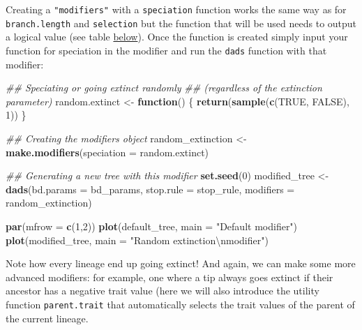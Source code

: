 \documentclass[]{book}
\newenvironment{Shaded}{\begin{snugshade}}{\end{snugshade}}
\newcommand{\CharTok}[1]{\textcolor[rgb]{0.31,0.60,0.02}{#1}}
\newcommand{\CommentTok}[1]{\textcolor[rgb]{0.56,0.35,0.01}{\textit{#1}}}
\newcommand{\ControlFlowTok}[1]{\textcolor[rgb]{0.13,0.29,0.53}{\textbf{#1}}}
\newcommand{\DataTypeTok}[1]{\textcolor[rgb]{0.13,0.29,0.53}{#1}}
\newcommand{\DecValTok}[1]{\textcolor[rgb]{0.00,0.00,0.81}{#1}}
\newcommand{\KeywordTok}[1]{\textcolor[rgb]{0.13,0.29,0.53}{\textbf{#1}}}
\newcommand{\NormalTok}[1]{#1}
\newcommand{\OtherTok}[1]{\textcolor[rgb]{0.56,0.35,0.01}{#1}}
\newcommand{\StringTok}[1]{\textcolor[rgb]{0.31,0.60,0.02}{#1}}
\begin{document}
Creating a \texttt{"modifiers"} with a \texttt{speciation} function works the same way as for \texttt{branch.length} and \texttt{selection} but the function that will be used needs to output a logical value (see table \protect\hyperlink{summarymodifiers}{below}).
Once the function is created simply input your function for speciation in the modifier and run the \texttt{dads} function with that modifier:

\begin{Shaded}
\begin{Highlighting}[]
\CommentTok{## Speciating or going extinct randomly}
\CommentTok{## (regardless of the extinction parameter)}
\NormalTok{random.extinct  <-}\StringTok{ }\ControlFlowTok{function}\NormalTok{() \{}
    \KeywordTok{return}\NormalTok{(}\KeywordTok{sample}\NormalTok{(}\KeywordTok{c}\NormalTok{(}\OtherTok{TRUE}\NormalTok{, }\OtherTok{FALSE}\NormalTok{), }\DecValTok{1}\NormalTok{))}
\NormalTok{\}}

\CommentTok{## Creating the modifiers object}
\NormalTok{random_extinction <-}\StringTok{ }\KeywordTok{make.modifiers}\NormalTok{(}\DataTypeTok{speciation =}\NormalTok{ random.extinct)}

\CommentTok{## Generating a new tree with this modifier}
\KeywordTok{set.seed}\NormalTok{(}\DecValTok{0}\NormalTok{)}
\NormalTok{modified_tree <-}\StringTok{ }\KeywordTok{dads}\NormalTok{(}\DataTypeTok{bd.params =}\NormalTok{ bd_params,}
                      \DataTypeTok{stop.rule =}\NormalTok{ stop_rule,}
                      \DataTypeTok{modifiers =}\NormalTok{ random_extinction)}

\KeywordTok{par}\NormalTok{(}\DataTypeTok{mfrow =} \KeywordTok{c}\NormalTok{(}\DecValTok{1}\NormalTok{,}\DecValTok{2}\NormalTok{))}
\KeywordTok{plot}\NormalTok{(default_tree,  }\DataTypeTok{main =} \StringTok{"Default modifier"}\NormalTok{)}
\KeywordTok{plot}\NormalTok{(modified_tree, }\DataTypeTok{main =} \StringTok{"Random extinction}\CharTok{\textbackslash{}n}\StringTok{modifier"}\NormalTok{)}
\end{Highlighting}
\end{Shaded}

Note how every lineage end up going extinct!
And again, we can make some more advanced modifiers: for example, one where a tip always goes extinct if their ancestor has a negative trait value (here we will also introduce the utility function \texttt{parent.trait} that automatically selects the trait values of the parent of the current lineage.
\end{document}
